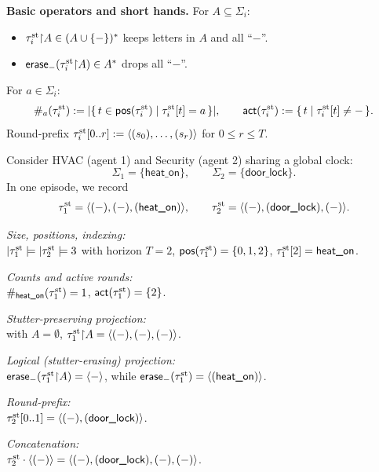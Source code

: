 \documentclass{article}
\begin{document}
  \noindent\textbf{Basic operators and short hands.}
  For \(A\subseteq\Sigma_i\):
  \begin{itemize}
    \item {} \( \tau^{\mathrm{st}}_i{\upharpoonright}A \in (A\cup\{-\})^{*} \) keeps letters in \(A\) and all “\(-\)”.
    \item {} \( \mathsf{erase}_{-}(\tau^{\mathrm{st}}_i{\upharpoonright}A)\in A^{*} \) drops all “\(-\)”.
  \end{itemize}
  For \(a\in\Sigma_i\):
  \[
  \#_{a}(\tau^{\mathrm{st}}_i) := |\{\, t\in\mathsf{pos}(\tau^{\mathrm{st}}_i)\mid \tau^{\mathrm{st}}_i[t]=a \,\}|,\qquad
  \mathsf{act}(\tau^{\mathrm{st}}_i):=\{\, t\mid \tau^{\mathrm{st}}_i[t]\neq - \,\}.
  \]
  Round-prefix \( \tau^{\mathrm{st}}_i[0..r]:=\langle (s_0),\dots,(s_r) \rangle  \) for \(0\le r\le T\).
  
  \begin{example}
  Consider HVAC (agent 1) and Security (agent 2) sharing a global clock:
  \[
  \Sigma_1=\{\textsf{heat\_on}\},\qquad 
  \Sigma_2=\{\textsf{door\_lock}\}.
  \]
  In one episode, we record
  \[
  \tau^{\mathrm{st}}_1=\langle (-),(-),(\textsf{heat\_on}) \rangle ,\qquad
  \tau^{\mathrm{st}}_2=\langle (-),(\textsf{door\_lock}),(-) \rangle .
  \]
  
  \noindent\emph{Size, positions, indexing:}\\
  \(|\tau^{\mathrm{st}}_1|=|\tau^{\mathrm{st}}_2|=3\) with horizon \(T=2\),  
  \(\mathsf{pos}(\tau^{\mathrm{st}}_1)=\{0,1,2\}\),  
  \(\tau^{\mathrm{st}}_1[2]=\textsf{heat\_on}\).
  
  \noindent\emph{Counts and active rounds:}\\
  \(\#_{\textsf{heat\_on}}(\tau^{\mathrm{st}}_1)=1\),  
  \(\mathsf{act}(\tau^{\mathrm{st}}_1)=\{2\}\).
  
  \noindent\emph{Stutter-preserving projection:}\\
  with \(A=\emptyset\),  
  \(\tau^{\mathrm{st}}_1{\upharpoonright}A=\langle (-),(-),(-) \rangle \).
  
  \noindent\emph{Logical (stutter-erasing) projection:}\\
  \(\mathsf{erase}_{-}(\tau^{\mathrm{st}}_1{\upharpoonright}A)=\langle - \rangle \),  
  while \(\mathsf{erase}_{-}(\tau^{\mathrm{st}}_1)=\langle (\textsf{heat\_on}) \rangle \).
  
  \noindent\emph{Round-prefix:}\\
  \(\tau^{\mathrm{st}}_2[0..1]=\langle (-),(\textsf{door\_lock}) \rangle \).
  
  \noindent\emph{Concatenation:}\\
  \(\tau^{\mathrm{st}}_2\cdot\langle (-) \rangle =\langle (-),(\textsf{door\_lock}),(-),(-) \rangle \).
  \end{example}
\end{document}
